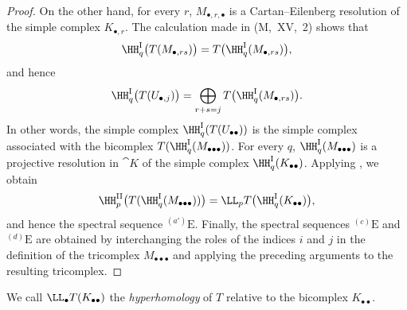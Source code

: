 \begin{proof}
On the other hand, for every $r$, $M_{\bullet,r,\bullet}$ is a
Cartan--Eilenberg resolution of the simple complex $K_{\bullet,r}$.
The calculation made in (M,~XV,~2) shows that
\[
  \HH^{\mathrm{I}}_q\bigl(T(M_{\bullet,rs})\bigr)
  =
  T\bigl(\HH^{\mathrm{I}}_q(M_{\bullet,rs})\bigr),
\]
and hence
\[
  \HH^{\mathrm{I}}_q\bigl(T(U_{\bullet,j})\bigr)
  =
  \bigoplus_{r+s=j}
  T\bigl(\HH^{\mathrm{I}}_q(M_{\bullet,rs})\bigr).
\]
In other words, the simple complex
$\HH^{\mathrm{I}}_q(T(U_{\bullet\bullet}))$ is the simple complex
associated with the bicomplex
$T(\HH^{\mathrm{I}}_q(M_{\bullet\bullet\bullet}))$.
For every $q$, $\HH^{\mathrm{I}}_q(M_{\bullet\bullet\bullet})$ is a
projective resolution in $\cat{K}$ of the simple complex
$\HH^{\mathrm{I}}_q(K_{\bullet\bullet})$.
Applying , we obtain
\[
  \HH^{\mathrm{II}}_p
  \bigl(T(\HH^{\mathrm{I}}_q(M_{\bullet\bullet\bullet}))\bigr)
  =
  \LL_pT\bigl(\HH^{\mathrm{I}}_q(K_{\bullet\bullet})\bigr),
\]
and hence the spectral sequence ${}^{(a')}\mathrm{E}$.
Finally, the spectral sequences ${}^{(c)}\mathrm{E}$ and
${}^{(d)}\mathrm{E}$ are obtained by interchanging the roles of the
indices $i$ and $j$ in the definition of the tricomplex
$M_{\bullet\bullet\bullet}$ and applying the preceding arguments to the
resulting tricomplex.
\end{proof}

We call $\LL_\bullet T(K_{\bullet\bullet})$ the \emph{hyperhomology} of
$T$ relative to the bicomplex $K_{\bullet\bullet}$.

